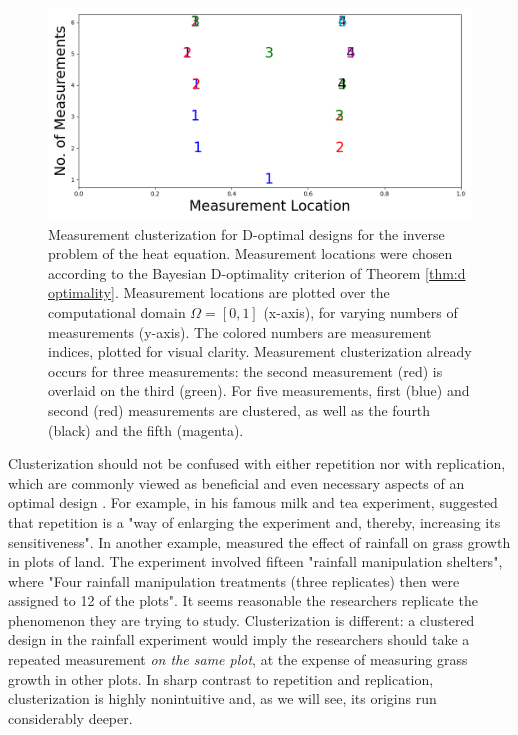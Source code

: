 \begin{figure}
    \centering
    \includegraphics[height=0.5\textwidth]{dst_modelError0.png}
    \caption{Measurement clusterization for D-optimal designs for the
      inverse problem of the heat equation. Measurement locations were
      chosen according to the Bayesian D-optimality criterion of
      Theorem \ref{thm:d optimality}. Measurement locations are
      plotted over the computational domain \(\Omega = [0, 1]\)
      (x-axis), for varying numbers of measurements (y-axis). The
      colored numbers are measurement indices, plotted for visual
      clarity. Measurement clusterization already occurs for three
      measurements: the second measurement (red) is overlaid on the
      third (green). For five measurements, first (blue) and second
      (red) measurements are clustered, as well as the fourth (black)
      and the fifth (magenta).}
  \label{fig:clusterization illustration}
\end{figure}


Clusterization should not be confused with either repetition nor with
replication, which are commonly viewed as beneficial and even
necessary aspects of an optimal design \cite{morris, fisher
  schafer2001replication}. For example, in his famous milk and tea
experiment, \cite[Section 11]{fisher} suggested that repetition is a
"way of enlarging the experiment and, thereby, increasing its
sensitiveness". In another example, \cite{fay2000rainfall} measured
the effect of rainfall on grass growth in plots of land. The
experiment involved fifteen "rainfall manipulation shelters", where
"Four rainfall manipulation treatments (three replicates) then were
assigned to 12 of the plots". It seems reasonable the researchers
replicate the phenomenon they are trying to study. Clusterization is
different: a clustered design in the rainfall experiment would imply
the researchers should take a repeated measurement \emph{on the same
plot}, at the expense of measuring grass growth in other plots. In
sharp contrast to repetition and replication, clusterization is highly
nonintuitive and, as we will see, its origins run considerably deeper.


